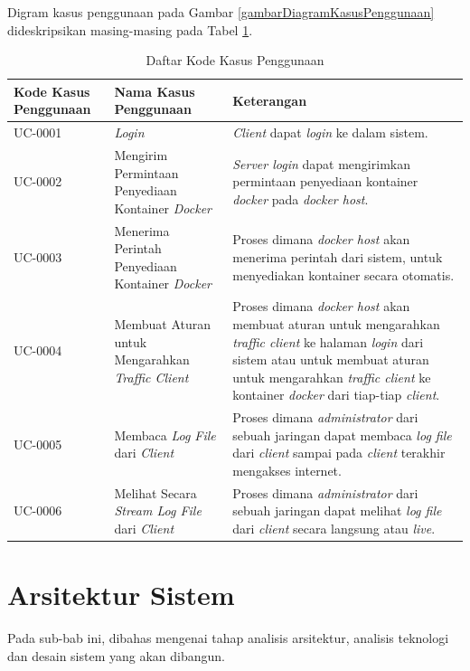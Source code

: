 Digram kasus penggunaan pada Gambar \ref{gambarDiagramKasusPenggunaan} dideskripsikan masing-masing pada Tabel \ref{tabelKodeKasusPenggunaan}.
\begin{longtable}{|p{}|p{}|p{}|} %
	
	\caption{Daftar Kode Kasus Penggunaan} \label{tabelKodeKasusPenggunaan} \\
	\hline
	\textbf{Kode Kasus Penggunaan} & \textbf{Nama Kasus Penggunaan} & \textbf{Keterangan} \\ \hline
	
	\endhead
	\endfoot
	\endlastfoot
	
	UC-0001 & \textit{Login} & \textit{Client} dapat \textit{login} ke dalam sistem. \\ \hline
	UC-0002 & Mengirim Permintaan Penyediaan Kontainer \textit{Docker} & \textit{Server login} dapat mengirimkan permintaan penyediaan kontainer \textit{docker} pada \textit{docker host}. \\ \hline
	UC-0003 & Menerima Perintah Penyediaan Kontainer \textit{Docker}  &  Proses dimana \textit{docker host} akan menerima perintah dari sistem, untuk menyediakan kontainer secara otomatis.\\ \hline
	UC-0004 & Membuat Aturan untuk Mengarahkan \textit{Traffic Client}  &  Proses dimana \textit{docker host} akan membuat aturan untuk mengarahkan \textit{traffic client} ke halaman \textit{login} dari sistem atau untuk membuat aturan untuk mengarahkan \textit{traffic client} ke kontainer \textit{docker} dari tiap-tiap \textit{client}. \\ \hline
	UC-0005 & Membaca \textit{Log File} dari \textit{Client}  &  Proses dimana \textit{administrator} dari sebuah jaringan dapat membaca \textit{log file} dari \textit{client} sampai pada \textit{client} terakhir mengakses internet.\\ \hline
	UC-0006 & Melihat Secara \textit{Stream Log File} dari \textit{Client}  &  Proses dimana \textit{administrator} dari sebuah jaringan dapat melihat \textit{log file} dari \textit{client} secara langsung atau \textit{live}.\\ \hline
\end{longtable}

\section{Arsitektur Sistem}
Pada sub-bab ini, dibahas mengenai tahap analisis arsitektur, analisis teknologi dan desain sistem yang akan dibangun.
